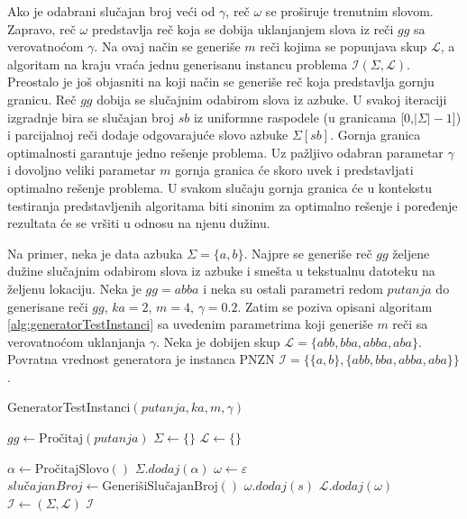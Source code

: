 \documentclass[12pt,oneside]{memoir}
\begin{document}
Ako je odabrani slučajan broj veći od $\gamma$, reč $\omega$ se proširuje
trenutnim slovom. Zapravo, reč $\omega$ predstavlja reč koja se dobija uklanjanjem slova iz 
reči $gg$ sa verovatnoćom $\gamma$.
Na ovaj način se generiše $m$ reči kojima se popunjava skup $\mathcal{L}$, a algoritam
na kraju vraća jednu generisanu instancu problema $\mathcal{I}(\Sigma,\mathcal{L})$.
Preostalo je još objasniti na koji način se generiše reč koja predstavlja gornju granicu.
Reč $gg$ dobija se slučajnim odabirom slova iz azbuke. U svakoj iteraciji 
izgradnje bira se slučajan broj $sb$ iz uniformne
raspodele (u granicama [0,$|\Sigma|-1$]) i parcijalnoj reči dodaje 
odgovarajuće slovo azbuke $\Sigma[sb]$.
Gornja granica optimalnosti garantuje jedno rešenje problema. Uz pažljivo odabran parametar
$\gamma$ i dovoljno veliki parametar $m$ gornja granica će skoro uvek i predstavljati
optimalno rešenje problema. U svakom slučaju gornja granica će u kontekstu testiranja
predstavljenih algoritama biti sinonim za optimalno rešenje i poređenje rezultata će se
vršiti u odnosu na njenu dužinu.

Na primer, neka je data azbuka $\Sigma=\{a,b\}$. Najpre se generiše reč $gg$ željene
dužine slučajnim odabirom slova iz azbuke i smešta u tekstualnu datoteku 
na željenu lokaciju. Neka je $gg=abba$ i neka su ostali parametri redom
$putanja$ do generisane reči $gg$, $ka=2$, $m=4$, $\gamma=0.2$.
Zatim se poziva opisani algoritam \ref{alg:generatorTestInstanci} sa uvedenim
parametrima koji generiše $m$ reči sa verovatnoćom uklanjanja $\gamma$. Neka je dobijen skup
$\mathcal{L}=\{abb,bba,abba,aba\}$. Povratna vrednost generatora je instanca PNZN
$\mathcal{I}=\{\{a,b\}, \{abb,bba,abba,aba\}\}$.
\begin{algorithm}
  \caption{\textrm{GeneratorTestInstanci}$(putanja,ka,m,\gamma)$}
  \label{alg:generatorTestInstanci}
  \begin{algorithmic}[1]
  \State $gg \gets \textrm{Pročitaj}(putanja)$ 
  \State $\Sigma \gets \{\}$
  \State $\mathcal{L} \gets \{\}$
  \State

    \State $\alpha \gets \textrm{PročitajSlovo}()$
    \State $\Sigma .dodaj(\alpha)$
  \EndFor
  \State
    \State $\omega \gets \varepsilon$
      \State $slu\textrm{č}ajanBroj \gets \textrm{GenerišiSlučajanBroj}()$
        \State $\omega .dodaj(s)$
      \EndIf
    \EndFor
    \State
    \State $\mathcal{L} .dodaj(\omega)$
    \State
  \EndFor
  \State
  \State $\mathcal{I} \gets (\Sigma,\mathcal{L})$
  \State
  \State \Return $\mathcal{I}$
  \end{algorithmic}
  \end{algorithm}
\end{document}
